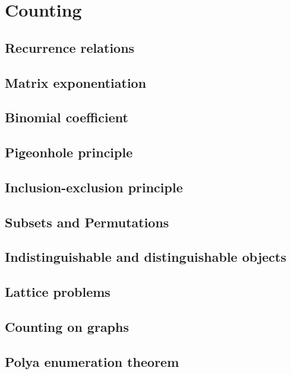 \chapter{Counting}
\minitoc

\section{Recurrence relations}

\section{Matrix exponentiation}

\section{Binomial coefficient}

\section{Pigeonhole principle}

\section{Inclusion-exclusion principle}

\section{Subsets and Permutations}

\section{Indistinguishable and distinguishable objects}

\section{Lattice problems}

\section{Counting on graphs}

\section{Polya enumeration theorem}